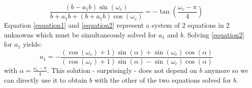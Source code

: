 \begin{equation}
\boxed
{
 \frac{(b - a_1 b) \sin (\omega_c)} {b + a_1 b + (b + a_1 b) \cos (\omega_c)}
 = - \tan \left( \frac{\omega_c -\pi}{4} \right)
}
 \label{equation2}
\end{equation}
Equation \ref{equation1} and \ref{equation2} represent a system of 2 equations in 2 unknowns which must be simultaneously solved for $a_1$ and $b$. Solving \ref{equation2} for $a_1$ yields:
\begin{equation}
 a_1 = - \frac{(\cos(\omega_c)+1) \sin(\alpha) + \sin(\omega_c) \cos(\alpha)}
              {(\cos(\omega_c)+1) \sin(\alpha) - \sin(\omega_c) \cos(\alpha)}
\end{equation}
with $\alpha = \frac{\omega_c - \pi}{4}$. This solution - surprisingly - does not depend on $b$ anymore so we can directly use it to obtain $b$ with the other of the two equations solved for $b$.






